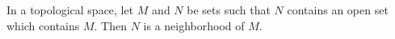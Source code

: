 In a topological space, let $M$ and $N$ be sets such that $N$ contains an open set which contains $M$. Then $N$ is a neighborhood of $M$.
